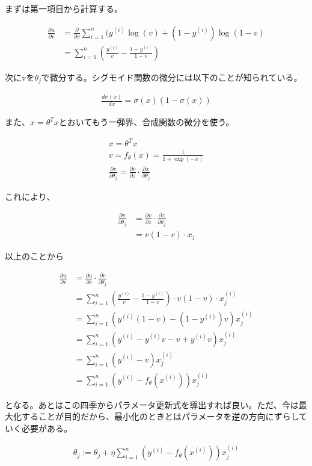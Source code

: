 \documentclass{jsarticle}
\begin{document}
まずは第一項目から計算する。

\begin{align}
	\frac{\partial u}{\partial v} &= \frac{\partial}{\partial v} \sum_{i=1}^{n} (y^{(i)} \log(v) + (1-y^{(i)}) \log(1-v) \\
    &= \sum_{i=1}^{n}(\frac{y^{(i)}}{v} - \frac{1-y^{(i)}}{1-v})
\end{align}

次にvを$\theta_j$で微分する。シグモイド関数の微分には以下のことが知られている。

\begin{align}
	\frac{d \sigma(x)}{dx} = \sigma(x)(1-\sigma(x))
\end{align}

また、$x=\theta^{T}x$とおいてもう一弾界、合成関数の微分を使う。

\begin{align}
	x = \theta^{T}x \\
    v = f_\theta(x) = \frac{1}{1+\exp(-x)} \\
    \frac{\partial v}{\partial \theta_j} = \frac{\partial v}{\partial z} \cdot \frac{\partial x}{\partial \theta_j}
\end{align}

これにより、

\begin{align}
	\frac{\partial v}{\partial \theta_j} &= \frac{\partial v}{\partial z} \cdot \frac{\partial z}{\partial \theta_j} \\
    &= v(1-v) \cdot x_j
\end{align}

以上のことから

\begin{align}
	\frac{\partial u}{\partial v} &= \frac{\partial u}{\partial v} \cdot \frac{\partial v}{\partial \theta_j} \\
    &= \sum_{i=1}^{n} (\frac{y^{(i)}}{v} - \frac{1-y^{(i)}}{1-v}) \cdot v(1-v) \cdot x_j^{(i)} \\
    &= \sum_{i=1}^{n} (y^{(i)}(1-v) - (1-y^{(i)})v)x_j^{(i)} \\
    &= \sum_{i=1}^{n} (y^{(i)} - y^{(i)}v - v + y^{(i)}v)x_j^{(i)} \\
    &= \sum_{i=1}^{n} (y^{(i)} - v ) x_j^{(i)} \\
    &= \sum_{i=1}^{n} (y^{(i)} - f_\theta(x^{(i)}))x_j^{(i)}
\end{align}

となる。あとはこの四季からパラメータ更新式を導出すれば良い。ただ、今は最大化することが目的だから、最小化のときとはパラメータを逆の方向にずらしていく必要がある。

\begin{align}
	\theta_j := \theta_j + \eta \sum_{i=1}^{n} (y^{(i)} - f_\theta(x^{(i)}))x_j^{(i)}
\end{align}
\end{document}
